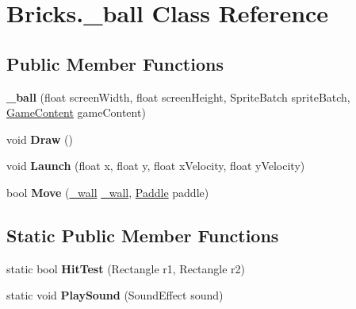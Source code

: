 \hypertarget{class_bricks_1_1__ball}{}\section{Bricks.\+\_\+ball Class Reference}
\label{class_bricks_1_1__ball}
\subsection*{Public Member Functions}
\begin{DoxyCompactItemize}
\item 
\mbox{\label{class_bricks_1_1__ball_afd080fc55b5763853f74fa430b4ab25b}} 
{\bfseries \+\_\+ball} (float screen\+Width, float screen\+Height, Sprite\+Batch sprite\+Batch, \mbox{\hyperlink{class_bricks_1_1_game_content}{Game\+Content}} game\+Content)
\item 
\mbox{\label{class_bricks_1_1__ball_a7ac226becc47f76f2e201caec7887fc8}} 
void {\bfseries Draw} ()
\item 
\mbox{\label{class_bricks_1_1__ball_acd56100386fb4c9bf559aa60385eeef8}} 
void {\bfseries Launch} (float x, float y, float x\+Velocity, float y\+Velocity)
\item 
\mbox{\label{class_bricks_1_1__ball_ae266ee40df95ad8c24ba1e345e3cda32}} 
bool {\bfseries Move} (\mbox{\hyperlink{class_bricks_1_1__wall}{\+\_\+wall}} \mbox{\hyperlink{class_bricks_1_1__wall}{\+\_\+wall}}, \mbox{\hyperlink{class_bricks_1_1_paddle}{Paddle}} paddle)
\end{DoxyCompactItemize}
\subsection*{Static Public Member Functions}
\begin{DoxyCompactItemize}
\item 
\mbox{\label{class_bricks_1_1__ball_a78841fded34699189fc5ad250ab5c248}} 
static bool {\bfseries Hit\+Test} (Rectangle r1, Rectangle r2)
\item 
\mbox{\label{class_bricks_1_1__ball_a6ca2a30481ac73c2a1dd305c8447e327}} 
static void {\bfseries Play\+Sound} (Sound\+Effect sound)
\end{DoxyCompactItemize}

